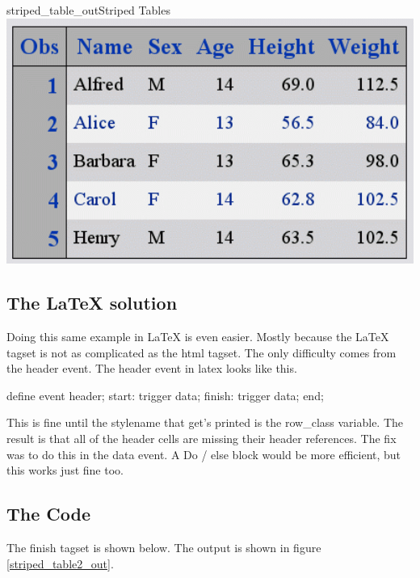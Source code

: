 \begin{goutput}{striped_table_out}{Striped Tables}
\includegraphics[width=6in]{striped.png}
\end{goutput}

\subsection{The LaTeX solution}
Doing this same example in LaTeX is even easier.  Mostly because
the LaTeX tagset is not as complicated as the html tagset.
The only difficulty comes from the header event.  The header event
in latex looks like this.
\begin{sfvcode}
        define event header;
            start:
               trigger data;
            finish:
               trigger data;
        end;
\end{sfvcode}

This is fine until the stylename that get's printed is the row\_class
variable.  The result is that all of the header cells are
missing their header references.  The fix was to do this in the data
event.   A Do / else block would be more efficient, but this works
just fine too.

\subsection{The Code}
The finish tagset is shown below. The output is shown 
in figure \vref{striped_table2_out}.

